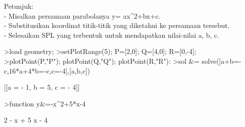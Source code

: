 \documentclass[a4paper,10pt]{article}
\begin{document}
\begin{eulernotebook}
\begin{eulercomment}
\begin{eulercomment}
\begin{eulercomment}
\begin{eulercomment}
\begin{eulercomment}
\begin{eulercomment}
\begin{eulercomment}
\begin{eulercomment}
\begin{eulercomment}
\begin{eulercomment}
\begin{eulercomment}
\begin{eulercomment}
\begin{eulercomment}
\begin{eulercomment}
\begin{eulercomment}
\begin{eulercomment}
\begin{eulercomment}
\begin{eulercomment}
\begin{eulercomment}
\begin{eulercomment}
\begin{eulercomment}
\begin{eulercomment}
\begin{eulercomment}
\begin{eulercomment}
\begin{eulercomment}
\begin{eulercomment}
\begin{eulercomment}
\begin{eulercomment}
\begin{eulercomment}
\begin{eulercomment}
\begin{eulercomment}
Petunjuk:\\
- Misalkan persamaan parabolanya y= ax\textasciicircum{}2+bx+c.\\
- Substitusikan koordinat titik-titik yang diketahui ke persamaan
tersebut.\\
- Selesaikan SPL yang terbentuk untuk mendapatkan nilai-nilai a, b, c.
\end{eulercomment}
\begin{eulerprompt}
>load geometry;
>setPlotRange(5); P=[2,0]; Q=[4,0]; R=[0,-4];
>plotPoint(P,"P"); plotPoint(Q,"Q"); plotPoint(R,"R"):
>sol &= solve([a+b=-c,16*a+4*b=-c,c=-4],[a,b,c])
\end{eulerprompt}
\begin{euleroutput}
  
                       [[a = - 1, b = 5, c = - 4]]
  
\end{euleroutput}
\begin{eulerprompt}
>function y&=-x^2+5*x-4
\end{eulerprompt}
\begin{euleroutput}
  
                                 2
                              - x  + 5 x - 4
  

\end{euleroutput}
\end{eulercomment}
\end{eulercomment}
\end{eulercomment}
\end{eulercomment}
\end{eulercomment}
\end{eulercomment}
\end{eulercomment}
\end{eulercomment}
\end{eulercomment}
\end{eulercomment}
\end{eulercomment}
\end{eulercomment}
\end{eulercomment}
\end{eulercomment}
\end{eulercomment}
\end{eulercomment}
\end{eulercomment}
\end{eulercomment}
\end{eulercomment}
\end{eulercomment}
\end{eulercomment}
\end{eulercomment}
\end{eulercomment}
\end{eulercomment}
\end{eulercomment}
\end{eulercomment}
\end{eulercomment}
\end{eulercomment}
\end{eulercomment}
\end{eulercomment}
\end{eulernotebook}
\end{document}
